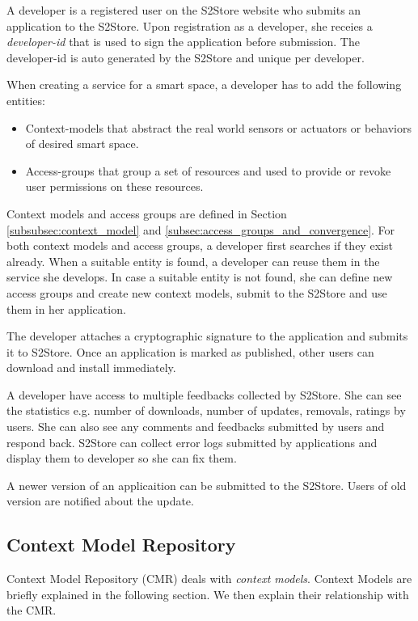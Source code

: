 A developer is a registered user on the S2Store website who submits an application to the S2Store. Upon registration as a developer, she receies a \emph{developer-id} that is used to sign the application before submission. The developer-id is auto generated by the S2Store and unique per developer.

When creating a service for a smart space, a developer has to add the following entities:

\begin{itemize}
  \item Context-models that abstract the real world sensors or actuators or behaviors of desired smart space.
  \item Access-groups that group a set of resources and used to provide or revoke user permissions on these resources.
\end{itemize}

Context models and access groups are defined in Section \ref{subsubsec:context_model} and \ref{subsec:access_groups_and_convergence}. For both context models and access groups, a developer first searches if they exist already. When a suitable entity is found, a developer can reuse them in the service she develops. In case a suitable entity is not found, she can define new access groups and create new context models, submit to the S2Store and use them in her application.

The developer attaches a cryptographic signature to the application and submits it to S2Store. Once an application is marked as published, other users can download and install immediately.

A developer have access to multiple feedbacks collected by S2Store. She can see the statistics e.g. number of downloads, number of updates, removals, ratings by users. She can also see any comments and feedbacks submitted by users and respond back. S2Store can collect error logs submitted by applications and display them to developer so she can fix them.

A newer version of an applicaition can be submitted to the S2Store. Users of old version are notified about the update.

\subsection{Context Model Repository}
\label{subsec:cmr}

Context Model Repository (CMR) deals with \emph{context models}. Context Models are briefly explained in the following section. We then explain their relationship with the CMR.

